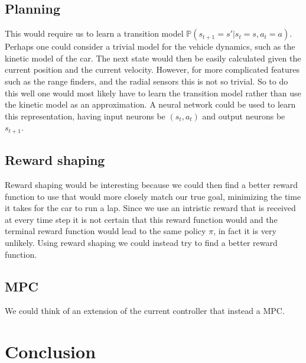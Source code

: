 \documentclass{article}
\begin{document}
\subsection{Planning}

This would require us to learn a transition model  $\mathbb{P}(s_{t+1}=s'|s_t=s,a_t=a)$. Perhaps one could consider a trivial model for the vehicle dynamics, such as the kinetic model of the car. The next state would then be easily calculated given the current position and the current velocity. However, for more complicated features such as the range finders, and the radial sensors this is not so trivial. So to do this well one would most likely have to learn the transition model rather than use the kinetic model as an approximation. A neural network could be used to learn this representation, having input neurons be $(s_t,a_t)$ and output neurons be $s_{t+1}$.

\subsection{Reward shaping}

Reward shaping would be interesting because we could then find a better reward function to use that would more closely match our true goal, minimizing the time it takes for the car to run a lap. Since we use an intristic reward that is received at every time step it is not certain that this reward function would and the terminal reward function would lead to the same policy $\pi$, in fact it is very unlikely. Using reward shaping we could instead try to find a better reward function.

\subsection{MPC}

We could think of an extension of the current controller that instead a MPC.

\section{Conclusion}
\end{document}
